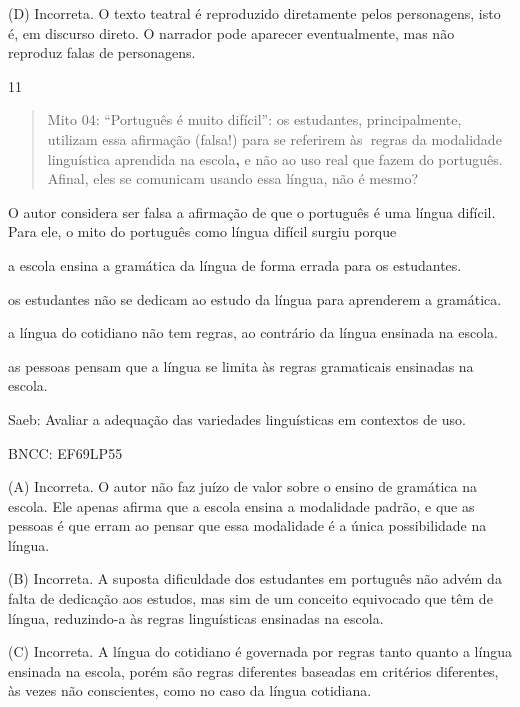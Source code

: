 (D) Incorreta. O texto teatral é reproduzido diretamente pelos
personagens, isto é, em discurso direto. O narrador pode aparecer
eventualmente, mas não reproduz falas de personagens.

\num{11}

\begin{quote}
Mito 04: ``Português é muito difícil'': os estudantes, principalmente,
utilizam essa afirmação (falsa!) para se referirem às\textbf{~}regras da
modalidade linguística aprendida na escola\textbf{,} e não ao uso real
que fazem do português. Afinal, eles se comunicam usando essa língua,
não é mesmo?
\end{quote}


O autor considera ser falsa a afirmação de que o português é uma língua
difícil. Para ele, o mito do português como língua difícil surgiu porque

\begin{escolha}
\item a escola ensina a gramática da língua de forma errada para os
estudantes.

\item os estudantes não se dedicam ao estudo da língua para aprenderem a
gramática.

\item a língua do cotidiano não tem regras, ao contrário da língua ensinada
na escola.

\item as pessoas pensam que a língua se limita às regras gramaticais
ensinadas na escola.
\end{escolha}

Saeb: Avaliar a adequação das variedades linguísticas em contextos de
uso.

BNCC: EF69LP55

(A) Incorreta. O autor não faz juízo de valor sobre o ensino de
gramática na escola. Ele apenas afirma que a escola ensina a modalidade
padrão, e que as pessoas é que erram ao pensar que essa modalidade é a
única possibilidade na língua.

(B) Incorreta. A suposta dificuldade dos estudantes em português não
advém da falta de dedicação aos estudos, mas sim de um conceito
equivocado que têm de língua, reduzindo-a às regras linguísticas
ensinadas na escola.

(C) Incorreta. A língua do cotidiano é governada por regras tanto quanto
a língua ensinada na escola, porém são regras diferentes baseadas em
critérios diferentes, às vezes não conscientes, como no caso da língua
cotidiana.

